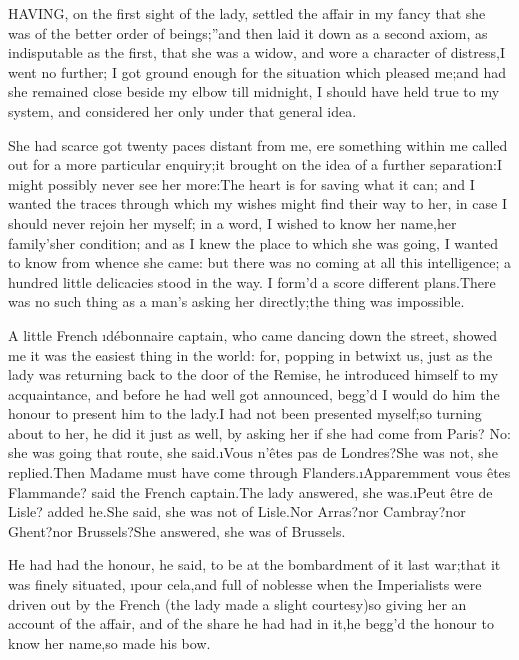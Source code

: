 \documentclass[twoside]{article}
\begin{document}


HAVING, on the first sight of the lady, settled the affair in my fancy
\lqq that she was of the better order of beings;”\tsk and then laid it down as a
second axiom, as indisputable as the first, that she was a widow, and
wore a character of distress,\tsk I went no further; I got ground enough for
the situation which pleased me;\tsk and had she remained close beside my
elbow till midnight, I should have held true to my system, and considered
her only under that general idea.

She had scarce got twenty paces distant from me, ere something within me
called out for a more particular enquiry;\tsk it brought on the idea of a
further separation:\tsk I might possibly never see her more:\tsk The heart is for
saving what it can; and I wanted the traces through which my wishes might
find their way to her, in case I should never rejoin her myself; in a
word, I wished to know her name,\tsk her family’s\tsk her condition; and as I
knew the place to which she was going, I wanted to know from whence she
came: but there was no coming at all this intelligence; a hundred little
delicacies stood in the way.  I form’d a score different plans.\tsk There was
no such thing as a man’s asking her directly;\tsk the thing was impossible.

A little French \i{débonnaire} captain, who came dancing down the street,
showed me it was the easiest thing in the world: for, popping in betwixt
us, just as the lady was returning back to the door of the Remise, he
introduced himself to my acquaintance, and before he had well got
announced, begg’d I would do him the honour to present him to the lady.\tsk I
had not been presented myself;\tsk so turning about to her, he did it just as
well, by asking her if she had come from Paris?  No: she was going that
route, she said.\tsk \i{Vous n’êtes pas de Londres}?\tsk She was not, she
replied.\tsk Then Madame must have come through Flanders.\tsk \i{Apparemment vous
êtes Flammande}? said the French captain.\tsk The lady answered, she
was.\tsk \i{Peut être de Lisle}? added he.\tsk She said, she was not of Lisle.\tsk Nor
Arras?\tsk nor Cambray?\tsk nor Ghent?\tsk nor Brussels?\tsk She answered, she was of
Brussels.

He had had the honour, he said, to be at the bombardment of it last
war;\tsk that it was finely situated, \i{pour cela},\tsk and full of noblesse when
the Imperialists were driven out by the French (the lady made a slight
courtesy)\tsk so giving her an account of the affair, and of the share he had
had in it,\tsk he begg’d the honour to know her name,\tsk so made his bow.
\end{document}
